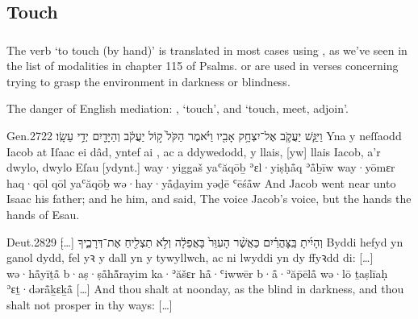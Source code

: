 \subsection{Touch}

\subsubsection{}

\begin{paper}
	The verb  ‘to touch (by hand)’ is translated in most cases using , as we’ve seen in the list of modalities in chapter 115 of Psalms.  or  are used in verses concerning trying to grasp the environment in darkness or blindness.  \tounfold{***}

	\begin{leftbar}
		\begin{compactitem}
			\item The danger of English mediation: , ‘touch’, and  ‘touch, meet, adjoin’.
		\end{compactitem}
	\end{leftbar}
\end{paper}

\begin{example}{Gen.}{27}{22}{}{}
	\quoling
	{וַיִּגַּ֧שׁ יַעֲקֹ֛ב אֶל־יִצְחָ֥ק אָבִ֖יו  וַיֹּ֗אמֶר הַקֹּל֙ ק֣וֹל יַעֲקֹ֔ב וְהַיָּדַ֖יִם יְדֵ֥י עֵשָֽׂו׃}
	{Yna y neſſaodd Iacob at Iſaac ei dâd, yntef ai , ac a ddywedodd, y llais, [yw] llais Iacob, a’r dwylo, dwylo Eſau [ydynt.]}
	{way·yiggaš yaʿăqōḇ ʾɛl·yiṣḥå̄q ʾå̄ḇīw  way·yōmɛr haq·qōl qōl yaʿăqōḇ wə·hay·yå̄ḏayim yəḏē ʿēśå̄w}
	{And Jacob went near unto Isaac his father; and he  him, and said, The voice  Jacob's voice, but the hands  the hands of Esau.}
\end{example}

\begin{example}{Deut.}{28}{29}{}{}
	\quoling
	{וְהָיִ֜יתָ  בַּֽצָּהֳרַ֗יִם כַּאֲשֶׁ֨ר  הָעִוֵּר֙ בָּאֲפֵלָ֔ה וְלֹ֥א תַצְלִ֖יחַ אֶת־דְּרָכֶ֑יךָ […]׃}
	{Byddi hefyd yn  ganol dydd, fel yꝛ  y dall yn y tywyllwch, ac ni lwyddi yn dy ffyꝛdd di: […]}
	{wə·hå̄yīṯå̄  b·aṣ·ṣå̄hå̄̆rayim ka·ʾăšɛr  hå̄·ʿiwwēr b·å̄·ʾăp̄ēlå̄ wə·lō ṯaṣlīaḥ ʾɛṯ·dərå̄ḵɛḵå̄ […]}
	{And thou shalt  at noonday, as the blind  in darkness, and thou shalt not prosper in thy ways: […]}
\end{example}

